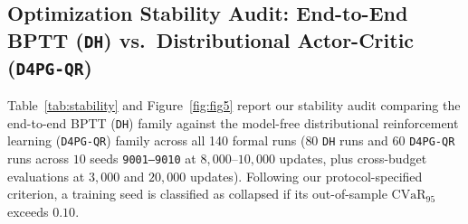 \documentclass[11pt,a4paper]{article}
\begin{document}
\subsection{Optimization Stability Audit: End-to-End BPTT (\texttt{DH}) vs.\ Distributional Actor-Critic (\texttt{D4PG-QR})}
\label{sec:stability}
Table~\ref{tab:stability} and Figure~\ref{fig:fig5} report our stability audit comparing the end-to-end BPTT (\texttt{DH}) family against the model-free distributional reinforcement learning (\texttt{D4PG-QR}) family across all 140 formal runs ($80$ \texttt{DH} runs and $60$ \texttt{D4PG-QR} runs across $10$ seeds \texttt{9001--9010} at $8,000\text{--}10,000$ updates, plus cross-budget evaluations at $3,000$ and $20,000$ updates). Following our protocol-specified criterion, a training seed is classified as collapsed if its out-of-sample $\text{CVaR}_{95}$ exceeds $0.10$.
\end{document}
